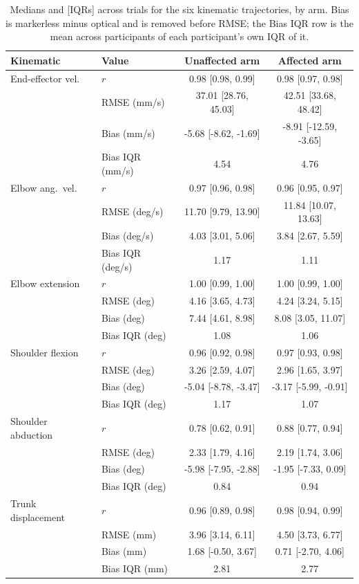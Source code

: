 \begin{table}[t]
\caption{Medians and [IQRs] across trials for the six kinematic trajectories, by arm.
Bias is markerless minus optical and is removed before RMSE; the Bias IQR row is the
mean across participants of each participant's own IQR of it.}
\label{tab:trajectories}
\centering
\scriptsize
\setlength{\tabcolsep}{3pt}
\begin{tabular}{llcc}
\toprule
Kinematic & Value & Unaffected arm & Affected arm \\
\midrule
End-effector vel. & $r$ & 0.98 [0.98, 0.99] & 0.98 [0.97, 0.98] \\
 & RMSE (mm/s) & 37.01 [28.76, 45.03] & 42.51 [33.68, 48.42] \\
 & Bias (mm/s) & -5.68 [-8.62, -1.69] & -8.91 [-12.59, -3.65] \\
 & Bias IQR (mm/s) & 4.54 & 4.76 \\
\midrule
Elbow ang.\ vel. & $r$ & 0.97 [0.96, 0.98] & 0.96 [0.95, 0.97] \\
 & RMSE (deg/s) & 11.70 [9.79, 13.90] & 11.84 [10.07, 13.63] \\
 & Bias (deg/s) & 4.03 [3.01, 5.06] & 3.84 [2.67, 5.59] \\
 & Bias IQR (deg/s) & 1.17 & 1.11 \\
\midrule
Elbow extension & $r$ & 1.00 [0.99, 1.00] & 1.00 [0.99, 1.00] \\
 & RMSE (deg) & 4.16 [3.65, 4.73] & 4.24 [3.24, 5.15] \\
 & Bias (deg) & 7.44 [4.61, 8.98] & 8.08 [3.05, 11.07] \\
 & Bias IQR (deg) & 1.08 & 1.06 \\
\midrule
Shoulder flexion & $r$ & 0.96 [0.92, 0.98] & 0.97 [0.93, 0.98] \\
 & RMSE (deg) & 3.26 [2.59, 4.07] & 2.96 [1.65, 3.97] \\
 & Bias (deg) & -5.04 [-8.78, -3.47] & -3.17 [-5.99, -0.91] \\
 & Bias IQR (deg) & 1.17 & 1.07 \\
\midrule
Shoulder abduction & $r$ & 0.78 [0.62, 0.91] & 0.88 [0.77, 0.94] \\
 & RMSE (deg) & 2.33 [1.79, 4.16] & 2.19 [1.74, 3.06] \\
 & Bias (deg) & -5.98 [-7.95, -2.88] & -1.95 [-7.33, 0.09] \\
 & Bias IQR (deg) & 0.84 & 0.94 \\
\midrule
Trunk displacement & $r$ & 0.96 [0.89, 0.98] & 0.98 [0.94, 0.99] \\
 & RMSE (mm) & 3.96 [3.14, 6.11] & 4.50 [3.73, 6.77] \\
 & Bias (mm) & 1.68 [-0.50, 3.67] & 0.71 [-2.70, 4.06] \\
 & Bias IQR (mm) & 2.81 & 2.77 \\
\bottomrule
\end{tabular}
\end{table}
